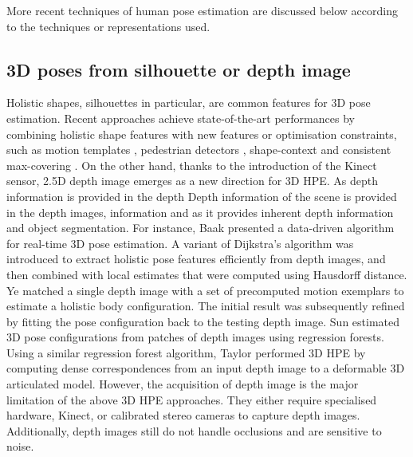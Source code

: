More recent techniques of human pose estimation are discussed below according to the techniques or representations used.

\subsection{3D poses from silhouette or depth image} 
Holistic shapes, silhouettes in particular, are common features for 3D pose estimation. 
Recent approaches achieve state-of-the-art performances by combining holistic shape features with new features or optimisation constraints, such as motion templates \cite{Rogez2012}, pedestrian detectors \cite{Andriluka2010}, shape-context \cite{Agarwal2006} and consistent max-covering \cite{Jiang2011}. 
On the other hand, thanks to the introduction of the Kinect sensor, 2.5D depth image emerges as a new direction for 3D HPE. 
As depth information is provided in the depth 
Depth information of the scene is provided in the depth images, information and as it provides inherent depth information and object segmentation. 
For instance, Baak \etal \cite{Baak2011} presented a data-driven algorithm for real-time 3D pose estimation. A variant of Dijkstra's algorithm was introduced to extract holistic pose features efficiently from depth images, and then combined with local estimates that were computed using Hausdorff distance. Ye \etal \cite{Ye2011} matched a single depth image with a set of precomputed motion exemplars to estimate a holistic body configuration. The initial result was subsequently refined by fitting the pose configuration back to the testing depth image. 
Sun \etal \cite{Sun2012} estimated 3D pose configurations from patches of depth images using regression forests.  
Using a similar regression forest algorithm, Taylor \etal \cite{Taylor2012} performed 3D HPE by computing dense correspondences from an input depth image to a deformable 3D articulated model.  
However, the acquisition of depth image is the major limitation of the above 3D HPE approaches. They either require specialised hardware, \eg Kinect, or calibrated stereo cameras to capture depth images. Additionally, depth images still do not handle occlusions and are sensitive to noise. 


